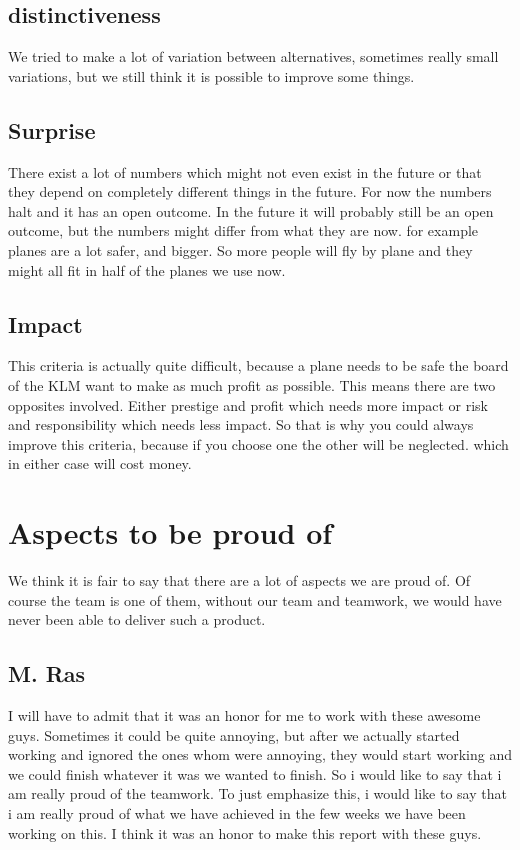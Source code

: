 \documentclass[a4paper, 11pt, notitlepage]{report}
\begin{document}
\section{distinctiveness}
    We tried to make a lot of variation between alternatives, sometimes really small variations, but we still think it is possible to improve some things.
\section{Surprise}
    There exist a lot of numbers which might not even exist in the future or that they depend on completely different things in the future. For now the numbers halt and it has an open outcome. In the future it will probably still be an open outcome, but the numbers might differ from what they are now. for example planes are a lot safer, and bigger. So more people will fly by plane and they might all fit in half of the planes we use now.
\section{Impact}
    This criteria is actually quite difficult, because a plane needs to be safe  the board of the KLM want to make as much profit as possible. This means there are two opposites involved. Either prestige and profit which needs more impact or risk and responsibility which needs less impact. So that is why you could always improve this criteria, because if you choose one the other will be neglected. which in either case will cost money.
	
\chapter{Aspects to be proud of}
	We think it is fair to say that there are a lot of aspects we are proud of. Of course the team is one of them, without our team and teamwork, we would have never been able to deliver such a product.
	
	\section{M. Ras}I will have to admit that it was an honor for me to work with these awesome guys. Sometimes it could be quite annoying, but after we actually started working and ignored the ones whom were annoying, they would start working and we could finish whatever it was we wanted to finish. So i would like to say that i am really proud of the teamwork. To just emphasize this, i would like to say that i am really proud of what we have achieved in the few weeks we have been working on this. I think it was an honor to make this report with these guys.
	
\end{document}
